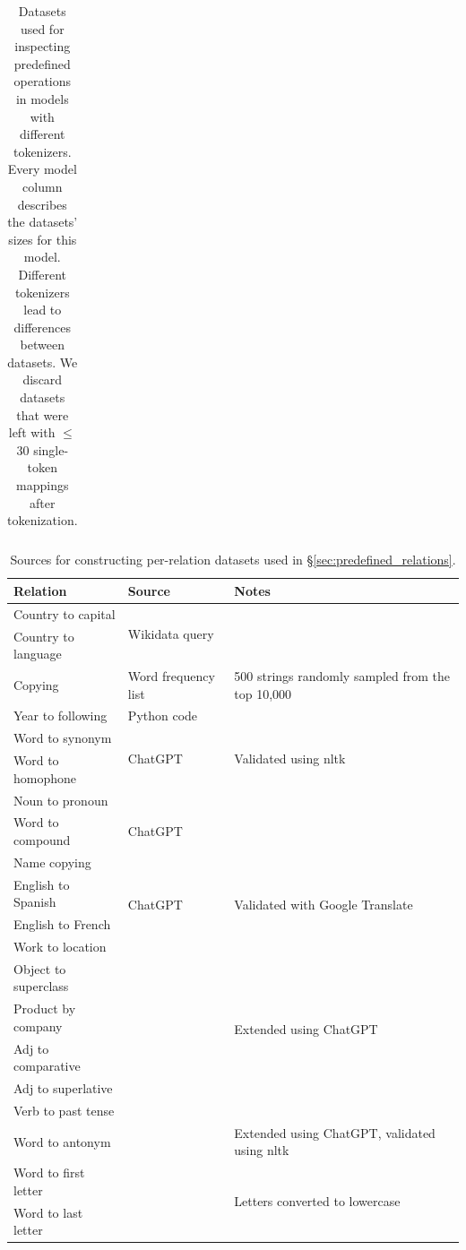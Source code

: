 \documentclass[11pt]{article}
\begin{document}
\begin{table}[t]
\begin{tabular}{llllrr}
\bottomrule
\end{tabular}
\caption{Datasets used for inspecting predefined operations in models with different tokenizers. Every model column describes the datasets' sizes for this model. Different tokenizers lead to differences between datasets. We discard datasets that were left with $\leq$30 single-token mappings after tokenization.
}
\label{tab:datasets_appendix}
\end{table}


\begin{table}[htbp]
\centering
\footnotesize
\setlength{\tabcolsep}{4pt}
\begin{tabular}{lp{1.5cm}p{2.6cm}}
\toprule
Relation & Source & Notes \\
\midrule
Country to capital & \multirow{2}{=}{Wikidata query} & \\
Country to language &  &  \\
\midrule
Copying & Word frequency list & 500 strings randomly sampled from the top 10,000 \\
\midrule
Year to following & Python code &  \\
\midrule
Word to synonym & \multirow{2}{=}{ChatGPT} & \multirow{2}{=}{Validated using nltk} \\
Word to homophone &  &  \\
\midrule
Noun to pronoun & \multirow{3}{=}{ChatGPT} &  \\
Word to compound &  &  \\
Name copying &  &  \\
\midrule
English to Spanish & \multirow{2}{*}{ChatGPT} & \multirow{2}{=}{Validated with Google Translate} \\
English to French &  &  \\
\midrule
Work to location & \multirow{6}{=}{\citet{hernandez2024linearity}} & \multirow{6}{=}{Extended using ChatGPT} \\
Object to superclass &  &  \\
Product by company &  &  \\
Adj to comparative &  &  \\
Adj to superlative &  &  \\
Verb to past tense &  &  \\
\midrule
Word to antonym & \citet{hernandez2024linearity} & Extended using ChatGPT, validated using nltk \\
\midrule
Word to first letter & \multirow{2}{=}{\citet{hernandez2024linearity}} & \multirow{2}{=}{Letters converted to lowercase} \\
Word to last letter &  &  \\
\bottomrule
\end{tabular}
\caption{Sources for constructing per-relation datasets used in \S\ref{sec:predefined_relations}.
}
\label{tab:datasets_sources}
\end{table}
\end{document}

